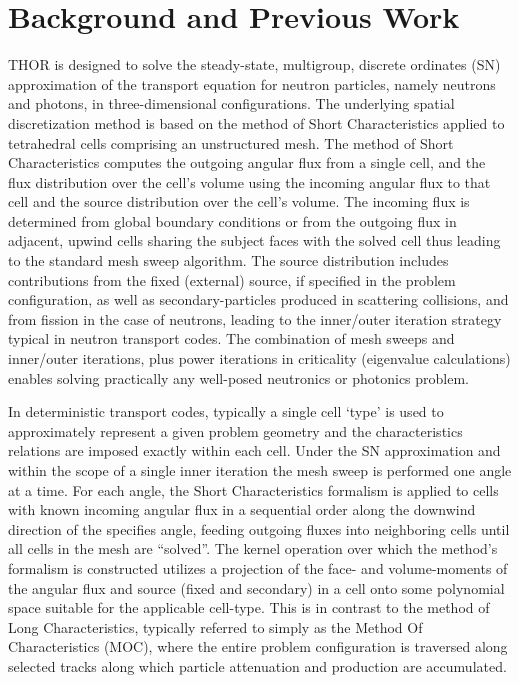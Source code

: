 \section{Background and Previous Work}

THOR is designed to solve the steady-state, multigroup, discrete ordinates (SN) approximation of the transport equation for neutron particles, namely neutrons and photons, in three-dimensional configurations. The underlying spatial discretization method is based on the method of Short Characteristics applied to tetrahedral cells comprising an unstructured mesh. The method of Short Characteristics computes the outgoing angular flux from a single cell, and the flux distribution over the cell’s volume using the incoming angular flux to that cell and the source distribution over the cell’s volume. The incoming flux is determined from global boundary conditions or from the outgoing flux in adjacent, upwind cells sharing the subject faces with the solved cell thus leading to the standard mesh sweep algorithm. The source distribution includes contributions from the fixed (external) source, if specified in the problem configuration, as well as secondary-particles produced in scattering collisions, and from fission in the case of neutrons, leading to the inner/outer iteration strategy typical in neutron transport codes. The combination of mesh sweeps and inner/outer iterations, plus power iterations in criticality (eigenvalue calculations) enables solving practically any well-posed neutronics or photonics problem.

In deterministic transport codes, typically a single cell ‘type’ is used to approximately represent a given problem geometry and the characteristics relations are imposed exactly within each cell. Under the SN approximation and within the scope of a single inner iteration the mesh sweep is performed one angle at a time. For each angle, the Short Characteristics formalism is applied to cells with known incoming angular flux in a sequential order along the downwind direction of the specifies angle, feeding outgoing fluxes into neighboring cells until all cells in the mesh are “solved”. The kernel operation over which the method’s formalism is constructed utilizes a projection of the face- and volume-moments of the angular flux and source (fixed and secondary) in a cell onto some polynomial space suitable for the applicable cell-type. This is in contrast to the method of Long Characteristics, typically referred to simply as the Method Of Characteristics (MOC), where the entire problem configuration is traversed along selected tracks along which particle attenuation and production are accumulated.

